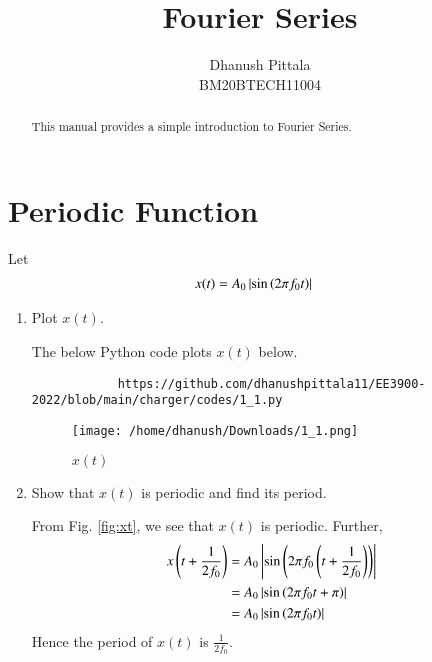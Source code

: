 \documentclass[journal,12pt,twocolumn]{IEEEtran}
\renewcommand\thesection{\arabic{section}}
\begin{document}
	\vspace{3cm}
	\title{Fourier Series}
	\author{Dhanush Pittala\\BM20BTECH11004}
	\maketitle
	\tableofcontents
	\renewcommand{\thefigure}{\theenumi}
	\renewcommand{\thetable}{\theenumi}
	\bigskip
	\begin{abstract}
		This manual provides a simple introduction to Fourier Series.
	\end{abstract}
	\section{Periodic Function}
	Let 
	\begin{align}
		x(t) &= A_0\left\vert\sin\left(2\pi f_0 t\right)\right\vert
		\label{eq:10-orig-diff-def}
	\end{align}
	\begin{enumerate}[label=\thesection.\arabic*
		,ref=\thesection.\theenumi]
		\item Plot $x(t)$.
		
		\solution The below Python code plots $x(t)$ below.
		\begin{lstlisting}
			https://github.com/dhanushpittala11/EE3900-2022/blob/main/charger/codes/1_1.py
		\end{lstlisting}
		\begin{figure}[!htp]
			\texttt{[image: /home/dhanush/Downloads/1\_1.png]}
			\caption{$x(t)$}
			\label{fig:xt}
		\end{figure}
		\item Show that $x(t)$ is periodic and find its period.
		
		\solution From Fig. \eqref{fig:xt}, we see that $x(t)$ is periodic. Further,
		\begin{align}
			x\left(t+\frac{1}{2f_0}\right) &= A_0\left\vert\sin\left(2\pi f_0\left(t + \frac{1}{2f_0}\right)\right)\right\vert \\
			&= A_0\left\vert\sin\left(2\pi f_0t + \pi\right)\right\vert \\
			&= A_0\left\vert\sin\left(2\pi f_0t\right)\right\vert
		\end{align}
		Hence the period of $x(t)$ is $\frac{1}{2f_0}$.
	\end{enumerate}
\end{document}
